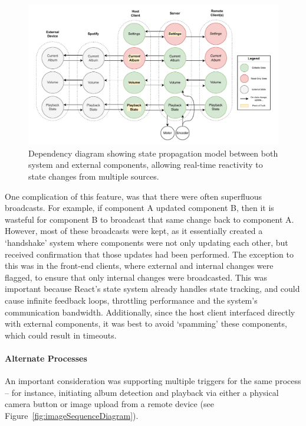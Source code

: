             \begin{figure}[h]
                \centering
                \includegraphics[width=\textwidth]{images/VTT_states.DependencyGraph.pdf}
                \caption{Dependency diagram showing state propagation model between both system and external components, allowing real-time reactivity to state changes from multiple sources.}
                \label{fig:statePropagationDiagram}
            \end{figure}
    
            One complication of this feature, was that there were often superfluous broadcasts. For example, if component A updated component B, then it is wasteful for component B to broadcast that same change back to component A. However, most of these broadcasts were kept, as it essentially created a `handshake' system where components were not only updating each other, but received confirmation that those updates had been performed. The exception to this was in the front-end clients, where external and internal changes were flagged, to ensure that only internal changes were broadcasted. This was important because React's state system already handles state tracking, and could cause infinite feedback loops, throttling performance and the system's communication bandwidth. Additionally, since the host client interfaced directly with external components, it was best to avoid `spamming' these components, which could result in timeouts.
    
            \paragraph{Alternate Processes}
    
            An important consideration was supporting multiple triggers for the same process -- for instance, initiating album detection and playback via either a physical camera button or image upload from a remote device (see Figure~\ref{fig:imageSequenceDiagram}).
    
